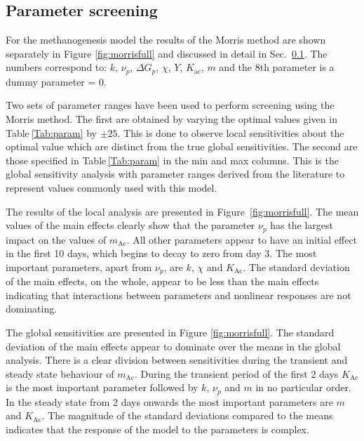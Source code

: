 \documentclass[a4paper, 12pt]{article}
\newcommand{\tmop}[1]{\ensuremath{\operatorname{#1}}}
\begin{document}
\subsection{Parameter screening}\label{Res:Morris}

\smallskip

For the methanogenesis model the results of the Morris method are shown
separately in Figure \ref{fig:morrisfull} and discussed in detail in Sec.~\ref{Res:Morris}. The numbers correspond to: $k$,	
$\nu_p$, $\Delta G_p$, $\chi$, $Y$, $K_{\tmop{ac}}$, $m$ and the 8th parameter is a dummy
parameter = 0.


Two sets of parameter ranges have been used to perform screening using the Morris method. The first are obtained by varying the optimal values given in Table\,\ref{Tab:param} by $\pm 25$. This is done to observe local sensitivities about the optimal value which are distinct from the true global sensitivities. The second are those specified in Table\,\ref{Tab:param} in the min and max columns. This is the global sensitivity analysis with parameter ranges derived from the literature to represent values commonly used with this model.

\smallskip

The results of the local analysis are presented in Figure~\ref{fig:morrisfull}. The mean values of the main effects clearly show that the parameter $\nu_p$ has the largest impact on the values of $m_\textrm{Ac}$. All other parameters appear to have an initial effect in the first 10 days, which begins to decay to zero from day 3. The most important parameters, apart from $\nu_p$, are $k$, $\chi$ and $K_{\textrm{Ac}}$. The standard deviation of the main effects, on the whole, appear to be less than the main effects indicating that interactions between parameters and nonlinear responses are not dominating.

\smallskip

The global sensitivities are presented in Figure \ref{fig:morrisfull}. The standard deviation of the main effects appear to dominate over the means in the global analysis. There is a clear division between sensitivities during the transient and steady state behaviour of $m_\textrm{Ac}$. During the transient period of the first 2 days $K_{\textrm{Ac}}$ is the most important parameter followed by $k$, $\nu_p$ and $m$ in no particular order. In the steady state from 2 days onwards the most important parameters are $m$ and $K_{\textrm{Ac}}$. The magnitude of the standard deviations compared to the means indicates that the response of the model to the parameters is complex.
\end{document}
